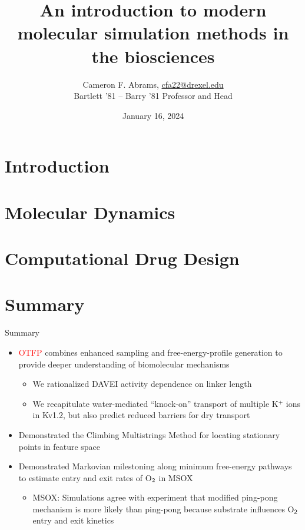 \documentclass[10pt]{beamer}
\title{An introduction to modern molecular simulation methods in the biosciences}
\date{January 16, 2024}
\author{Cameron F. Abrams, \href{mailto:cfa22@drexel.edu}{cfa22@drexel.edu}\\
Bartlett '81 -- Barry '81 Professor and Head }
\institute{Department of Chemical and Biological Engineering}
\begin{document}
\maketitle

\section{Introduction}







\section{Molecular Dynamics}







\section{Computational Drug Design}

\section{Summary}

\begin{frame}[fragile]{Summary}
\begin{itemize}
\item \textcolor{red}{OTFP} combines enhanced sampling and free-energy-profile generation to provide deeper understanding of biomolecular mechanisms
\begin{itemize}
\item We rationalized DAVEI activity dependence on linker length
\item We recapitulate water-mediated ``knock-on'' transport of multiple K$^+$ ions in Kv1.2, but also predict reduced barriers for dry transport
\end{itemize}
\item Demonstrated the \textcolor{magenta!80!black}{Climbing Multistrings Method} for locating stationary points in feature space
\item Demonstrated \textcolor{green!80!black}{Markovian milestoning} along minimum free-energy pathways to estimate entry and exit rates of O$_{\sf 2}$ in MSOX
\begin{itemize}
\item MSOX: Simulations agree with experiment that modified ping-pong mechanism is more likely than ping-pong because substrate influences O$_{\sf 2}$
entry and exit kinetics
\end{itemize}
\end{itemize}
\end{frame}

% 
\end{document}
